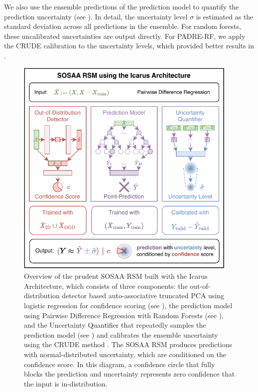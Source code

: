 We also use the ensemble predictions of the prediction model to quantify the prediction uncertainty (see ). In detail, the uncertainty level $\sigma$ is estimated as the standard deviation across all predictions in the ensemble. For random forests, these uncalibrated uncertainties are output directly. For PADRE-RF, we apply the CRUDE \cite{not-crude-uncertainty-2020} calibration to the uncertainty levels, which provided better results in .

\begin{figure}[H]
    \centering
    \includegraphics[width=0.95\textwidth]{evaluation/figures/sosaa-rsm.pdf}
    \caption[Overview of the prudent SOSAA RSM Architecture]{Overview of the prudent SOSAA RSM built with the Icarus Architecture, which consists of three components: the out-of-distribution detector based auto-associative truncated PCA using logistic regression for confidence scoring (see ), the prediction model using Pairwise Difference Regression with Random Forests (see ), and the Uncertainty Quantifier that repeatedly samples the prediction model (see ) and calibrates the ensemble uncertainty using the CRUDE method \cite{not-crude-uncertainty-2020}. The SOSAA RSM produces predictions with normal-distributed uncertainty, which are conditioned on the confidence score. In this diagram, a confidence circle that fully blocks the prediction and uncertainty represents zero confidence that the input is in-distribution.}
    \label{fig:sosaa-rsm}
\end{figure}

